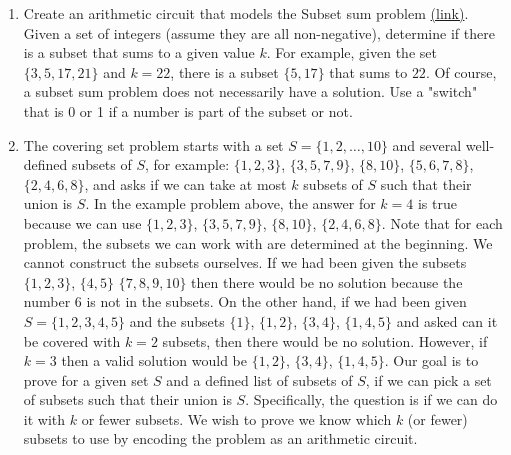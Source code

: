 \documentclass{article}
\begin{document}
\begin{enumerate}
    \item Create an arithmetic circuit that models the 
    Subset sum problem \href{https://en.wikipedia.org/wiki/Subset_sum_problem}{(link)}. Given a set of integers (assume they are all non-negative), determine if there is a subset that sums to a given value $k$. For example, given the set $\{3,5,17,21\}$ and $k = 22$, there is a subset $\{5, 17\}$ that sums to $22$. Of course, a subset sum problem does not necessarily have a solution.
    Use a "switch" that is 0 or 1 if a number is part of the subset or not.

    \item The covering set problem starts with a set $S = \{1, 2, \ldots, 10\}$ and several well-defined subsets of $S$, for example: $\{1, 2, 3\}$, $\{3, 5, 7, 9\}$, $\{8, 10\}$, $\{5, 6, 7, 8\}$, $\{2, 4, 6, 8\}$, and asks if we can take at most $k$ subsets of $S$ such that their union is $S$. In the example problem above, the answer for $k = 4$ is true because we can use $\{1, 2, 3\}$, $\{3, 5, 7, 9\}$, $\{8, 10\}$, $\{2, 4, 6, 8\}$. Note that for each problem, the subsets we can work with are determined at the beginning. We cannot construct the subsets ourselves. If we had been given the subsets $\{1,2,3\}$, $\{4,5\}$ $\{7,8,9,10\}$ then there would be no solution because the number $6$ is not in the subsets.
     On the other hand, if we had been given $S = \{1,2,3,4,5\}$ and the subsets $\{1\}$, $\{1,2\}$, $\{3, 4\}$, $\{1, 4, 5\}$ and asked can it be covered with $k = 2$ subsets, then there would be no solution. However, if $k = 3$ then a valid solution would be $\{1, 2\}$, $\{3, 4\}$, $\{1, 4, 5\}$.
     Our goal is to prove for a given set $S$ and a defined list of subsets of $S$, if we can pick a set of subsets such that their union is $S$. Specifically, the question is if we can do it with $k$ or fewer subsets. We wish to prove we know which $k$ (or fewer) subsets to use by encoding the problem as an arithmetic circuit.
\end{enumerate}
\end{document}
